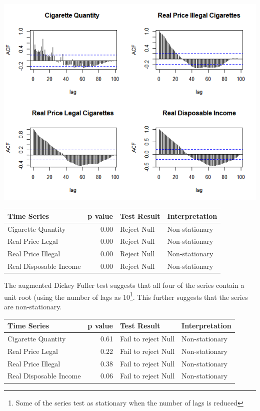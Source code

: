 \documentclass[11pt,preprint, authoryear]{elsarticle}
\let\origfigure\figure
\let\endorigfigure\endfigure
\renewenvironment{figure}[1][2] {
    \expandafter\origfigure\expandafter[H]
} {
    \endorigfigure
}
\let\origtable\table
\let\endorigtable\endtable
\renewenvironment{table}[1][2] {
    \expandafter\origtable\expandafter[H]
} {
    \endorigtable
}
\numberwithin{equation}{section}
\numberwithin{figure}{section}
\numberwithin{table}{section}
\let\rmarkdownfootnote\footnote%
\def\footnote{\protect\rmarkdownfootnote}
\begin{document}
\begin{figure}
\centering
\includegraphics{img/ACF.png}
\caption{\label{plot2} ACF Plots}
\end{figure}

\begin{table}[H]
\centering
\begin{tabular}{lrll}
  \hline
Time Series & p value & Test Result & Interpretation \\ 
  \hline
Cigarette Quantity & 0.00 & Reject Null & Non-stationary \\ 
  Real Price Legal & 0.00 & Reject Null & Non-stationary \\ 
  Real Price Illegal & 0.00 & Reject Null & Non-stationary \\ 
  Real Disposable Income & 0.00 & Reject Null & Non-stationary \\ 
   \hline
\end{tabular}
\caption{Ljung-Box Test \label{box}} 
\end{table}

The augmented Dickey Fuller test suggests that all four of the series
contain a unit root (using the number of lags as 10\footnote{Some of the
  series test as stationary when the number of lags is reduced}. This
further suggests that the series are non-stationary.

\begin{table}[H]
\centering
\begin{tabular}{lrll}
  \hline
Time Series & p value & Test Result & Interpretation \\ 
  \hline
Cigarette Quantity & 0.61 & Fail to reject Null & Non-stationary \\ 
  Real Price Legal & 0.22 & Fail to reject Null & Non-stationary \\ 
  Real Price Illegal & 0.38 & Fail to reject Null & Non-stationary \\ 
  Real Disposable Income & 0.06 & Fail to reject Null & Non-stationary \\ 
   \hline
\end{tabular}
\caption{Augmented Dickey-Fuller Test \label{adf}} 
\end{table}
\end{document}
